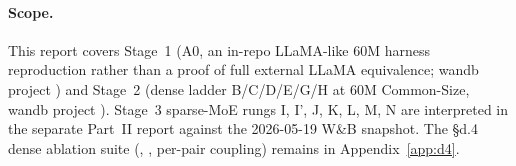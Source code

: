 \paragraph{Scope.}
This report covers Stage~1 (A0, an in-repo LLaMA-like 60M harness reproduction rather than a proof of full external LLaMA equivalence; wandb project ) and Stage~2 (dense ladder B/C/D/E/G/H at 60M Common-Size, wandb project ). Stage~3 sparse-MoE rungs I, I', J, K, L, M, N are interpreted in the separate Part~II report against the 2026-05-19 W\&B snapshot. The \S d.4 dense ablation suite (, , per-pair coupling) remains in Appendix~\ref{app:d4}.

